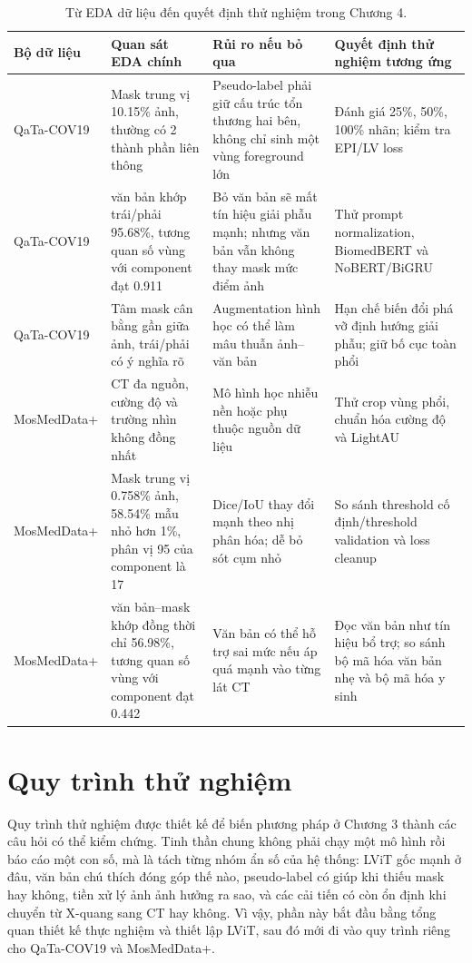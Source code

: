 \begin{table}[H]
  \centering
  \caption{Từ EDA dữ liệu đến quyết định thử nghiệm trong Chương 4.}
  \label{tab:eda-to-experiment-decisions}
  \small
  \renewcommand{\arraystretch}{1.18}
  \setlength{\tabcolsep}{3pt}
  \begin{tabularx}{\textwidth}{@{}l Y Y Y@{}}
    \toprule
    Bộ dữ liệu & Quan sát EDA chính & Rủi ro nếu bỏ qua & Quyết định thử nghiệm tương ứng \\
    \midrule
    QaTa-COV19 & Mask trung vị 10.15\% ảnh, thường có 2 thành phần liên thông & Pseudo-label phải giữ cấu trúc tổn thương hai bên, không chỉ sinh một vùng foreground lớn & Đánh giá 25\%, 50\%, 100\% nhãn; kiểm tra EPI/LV loss \\
    QaTa-COV19 & văn bản khớp trái/phải 95.68\%, tương quan số vùng với component đạt 0.911 & Bỏ văn bản sẽ mất tín hiệu giải phẫu mạnh; nhưng văn bản vẫn không thay mask mức điểm ảnh & Thử prompt normalization, BiomedBERT và NoBERT/BiGRU \\
    QaTa-COV19 & Tâm mask cân bằng gần giữa ảnh, trái/phải có ý nghĩa rõ & Augmentation hình học có thể làm mâu thuẫn ảnh--văn bản & Hạn chế biến đổi phá vỡ định hướng giải phẫu; giữ bố cục toàn phổi \\
    MosMedData+ & CT đa nguồn, cường độ và trường nhìn không đồng nhất & Mô hình học nhiễu nền hoặc phụ thuộc nguồn dữ liệu & Thử crop vùng phổi, chuẩn hóa cường độ và LightAU \\
    MosMedData+ & Mask trung vị 0.758\% ảnh, 58.54\% mẫu nhỏ hơn 1\%, phân vị 95 của component là 17 & Dice/IoU thay đổi mạnh theo nhị phân hóa; dễ bỏ sót cụm nhỏ & So sánh threshold cố định/threshold validation và loss cleanup \\
    MosMedData+ & văn bản--mask khớp đồng thời chỉ 56.98\%, tương quan số vùng với component đạt 0.442 & Văn bản có thể hỗ trợ sai mức nếu áp quá mạnh vào từng lát CT & Đọc văn bản như tín hiệu bổ trợ; so sánh bộ mã hóa văn bản nhẹ và bộ mã hóa y sinh \\
    \bottomrule
  \end{tabularx}
\end{table}
\FloatBarrier

\section{Quy trình thử nghiệm}

Quy trình thử nghiệm được thiết kế để biến phương pháp ở Chương 3 thành các câu hỏi có thể kiểm chứng. Tinh thần chung không phải chạy một mô hình rồi báo cáo một con số, mà là tách từng nhóm ẩn số của hệ thống: LViT gốc mạnh ở đâu, văn bản chú thích đóng góp thế nào, pseudo-label có giúp khi thiếu mask hay không, tiền xử lý ảnh ảnh hưởng ra sao, và các cải tiến có còn ổn định khi chuyển từ X-quang sang CT hay không. Vì vậy, phần này bắt đầu bằng tổng quan thiết kế thực nghiệm và thiết lập LViT, sau đó mới đi vào quy trình riêng cho QaTa-COV19 và MosMedData+.

